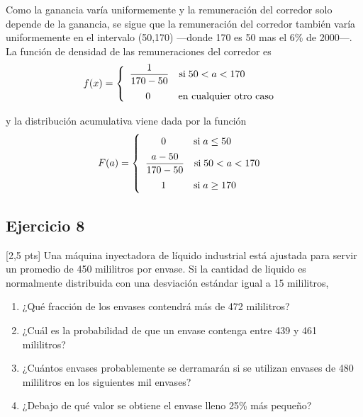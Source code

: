 \begin{sol}
	Como la ganancia varía uniformemente y la remuneración del corredor solo depende de la ganancia, se sigue que la remuneración del corredor también varía uniformemente en el intervalo (50,170) ---donde 170 es 50 mas el 6\% de 2000---. La función de densidad de las remuneraciones del corredor es 
	\[ 
	f(x) = \begin{cases}
	\hspace{.5em} \dfrac{1}{170-50}  \quad \text{si} \; 50<a<170 \\[.8em]
	\hspace{2.1em} 0  \hspace{2.8em} \text{en cualquier otro caso} 
	\end{cases}
	\]
	
	y la distribución acumulativa viene dada por la función
	\[ 
	F(a) = \begin{cases}
			\hspace{2.1em} 0  \hspace{2.8em} \text{si} \; a\leq 50 \\[.5em]
			\hspace{.5em} \dfrac{a-50}{170-50}  \quad \text{si} \; 50<a<170 \\[.8em]
			\hspace{2.1em} 1  \hspace{2.8em} \text{si} \; a\geq 170
		   \end{cases}
	\]
\end{sol}
\subsection*{Ejercicio 8}[2,5 pts]
	Una máquina inyectadora de líquido industrial está ajustada para servir un promedio de 450 mililitros por
	envase. Si la cantidad de liquido es normalmente distribuida con una desviación estándar igual a 15 mililitros,
	\begin{enumerate}
		\item ¿Qué fracción de los envases contendrá más de 472 mililitros?
		\item ¿Cuál es la probabilidad de que un envase contenga entre 439 y 461 mililitros?
		\item ¿Cuántos envases probablemente se derramarán si se utilizan envases de 480 mililitros en los siguientes mil
		envases?
		\item ¿Debajo de qué valor se obtiene el envase lleno 25\% más pequeño?
	\end{enumerate}

